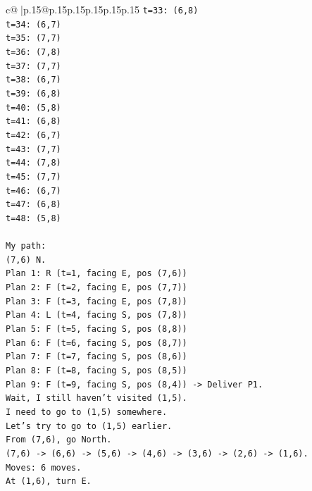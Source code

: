 \documentclass{article}
\begin{document}
{\begin{supertabular}{c@{$\;$}|p{.15\linewidth}@{}p{.15\linewidth}p{.15\linewidth}p{.15\linewidth}p{.15\linewidth}p{.15\linewidth}}
{{{\texttt{t=33: (6,8)} \\
\texttt{t=34: (6,7)} \\
\texttt{t=35: (7,7)} \\
\texttt{t=36: (7,8)} \\
\texttt{t=37: (7,7)} \\
\texttt{t=38: (6,7)} \\
\texttt{t=39: (6,8)} \\
\texttt{t=40: (5,8)} \\
\texttt{t=41: (6,8)} \\
\texttt{t=42: (6,7)} \\
\texttt{t=43: (7,7)} \\
\texttt{t=44: (7,8)} \\
\texttt{t=45: (7,7)} \\
\texttt{t=46: (6,7)} \\
\texttt{t=47: (6,8)} \\
\texttt{t=48: (5,8)} \\
\\ 
\texttt{My path:} \\
\texttt{(7,6) N.} \\
\texttt{Plan 1: R (t=1, facing E, pos (7,6))} \\
\texttt{Plan 2: F (t=2, facing E, pos (7,7))} \\
\texttt{Plan 3: F (t=3, facing E, pos (7,8))} \\
\texttt{Plan 4: L (t=4, facing S, pos (7,8))} \\
\texttt{Plan 5: F (t=5, facing S, pos (8,8))} \\
\texttt{Plan 6: F (t=6, facing S, pos (8,7))} \\
\texttt{Plan 7: F (t=7, facing S, pos (8,6))} \\
\texttt{Plan 8: F (t=8, facing S, pos (8,5))} \\
\texttt{Plan 9: F (t=9, facing S, pos (8,4)) {-}> Deliver P1.} \\
\texttt{Wait, I still haven't visited (1,5).} \\
\texttt{I need to go to (1,5) somewhere.} \\
\texttt{Let's try to go to (1,5) earlier.} \\
\texttt{From (7,6), go North.} \\
\texttt{(7,6) {-}> (6,6) {-}> (5,6) {-}> (4,6) {-}> (3,6) {-}> (2,6) {-}> (1,6).} \\
\texttt{Moves: 6 moves.} \\
\texttt{At (1,6), turn E.} \\
}}}
\end{supertabular}}
\end{document}

